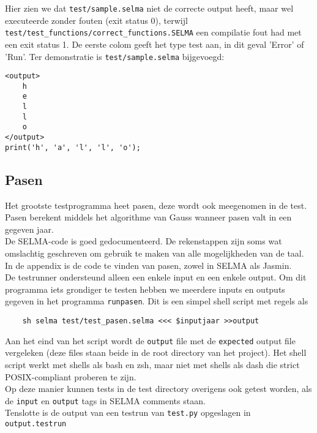 \documentclass[]{article}
\begin{document}
Hier zien we dat \texttt{test/sample.selma} niet de correcte output heeft, maar wel executeerde zonder fouten (exit status 0), terwijl \texttt{test/test\_functions/correct\_functions.SELMA} een compilatie fout had met een exit status 1. De eerste colom geeft het type test aan, in dit geval 'Error' of 'Run'. Ter demonstratie is \texttt{test/sample.selma} bijgevoegd:


\begin{lstlisting}[style=SELMA]
<output>
    h
    e
    l
    l
    o
</output>
print('h', 'a', 'l', 'l', 'o');
\end{lstlisting}

\subsection{Pasen}
Het grootste testprogramma heet pasen, deze wordt ook meegenomen in de test. Pasen berekent middels het algorithme van Gauss wanneer pasen valt in een gegeven jaar. \\
De SELMA-code is goed gedocumenteerd. De rekenstappen zijn soms wat omslachtig geschreven om gebruik te maken van alle mogelijkheden van de taal.\\
In de appendix is de code te vinden van pasen, zowel in SELMA als Jasmin.\\
De testrunner ondersteund alleen een enkele input en een enkele output. Om dit programma iets grondiger te testen hebben we meerdere inputs en outputs gegeven in het programma \texttt{runpasen}. Dit is een simpel shell script met regels als
\begin{verbatim}
	sh selma test/test_pasen.selma <<< $inputjaar >>output
\end{verbatim}

Aan het eind van het script wordt de \texttt{output} file met de \texttt{expected} output file vergeleken (deze files staan beide in de root directory van het project). Het shell script werkt met shells als bash en zsh, maar niet met shells als dash die strict POSIX-compliant proberen te zijn.\\

Op deze manier kunnen tests in de test directory overigens ook getest worden, als de \texttt{input} en \texttt{output} tags in SELMA comments staan.\\

Tenslotte is de output van een testrun van \texttt{test.py} opgeslagen in \texttt{output.testrun}


\newpage
\end{document}
